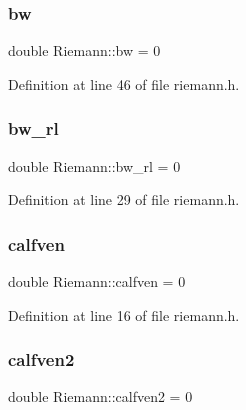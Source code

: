 \mbox{\label{classRiemann_ad58f9d90cbfb3f6aad77e605ae771b25}} 
\subsubsection{\texorpdfstring{bw}{bw}}
{\footnotesize\ttfamily double Riemann\+::bw = 0\hspace{0.3cm}{\ttfamily [private]}}



Definition at line 46 of file riemann.\+h.

\mbox{\label{classRiemann_a495ec1a2fa4ec5ff276d11acf850b95f}} 
\subsubsection{\texorpdfstring{bw\+\_\+rl}{bw\_rl}}
{\footnotesize\ttfamily double Riemann\+::bw\+\_\+rl = 0\hspace{0.3cm}{\ttfamily [private]}}



Definition at line 29 of file riemann.\+h.

\mbox{\label{classRiemann_a7f09440591b61458a2b03db835557fc3}} 
\subsubsection{\texorpdfstring{calfven}{calfven}}
{\footnotesize\ttfamily double Riemann\+::calfven = 0\hspace{0.3cm}{\ttfamily [private]}}



Definition at line 16 of file riemann.\+h.

\mbox{\label{classRiemann_a469ea9321f7b885685611aeaef06858b}} 
\subsubsection{\texorpdfstring{calfven2}{calfven2}}
{\footnotesize\ttfamily double Riemann\+::calfven2 = 0\hspace{0.3cm}{\ttfamily [private]}}



